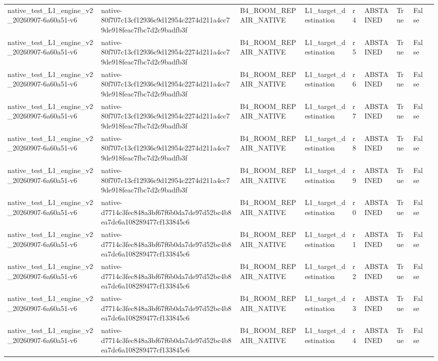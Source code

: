 \begin{tabular}{lllllllll}
native\_test\_L1\_engine\_v2\_20260907-6a60a51-v6 & native-80f707c13cf12936c9d12954c2274d211a4cc79de918feac7fbc7d2c9badfb3f & B4\_ROOM\_REPAIR\_NATIVE & L1\_target\_destination & r4 & ABSTAINED & True & False &  \\
native\_test\_L1\_engine\_v2\_20260907-6a60a51-v6 & native-80f707c13cf12936c9d12954c2274d211a4cc79de918feac7fbc7d2c9badfb3f & B4\_ROOM\_REPAIR\_NATIVE & L1\_target\_destination & r5 & ABSTAINED & True & False &  \\
native\_test\_L1\_engine\_v2\_20260907-6a60a51-v6 & native-80f707c13cf12936c9d12954c2274d211a4cc79de918feac7fbc7d2c9badfb3f & B4\_ROOM\_REPAIR\_NATIVE & L1\_target\_destination & r6 & ABSTAINED & True & False &  \\
native\_test\_L1\_engine\_v2\_20260907-6a60a51-v6 & native-80f707c13cf12936c9d12954c2274d211a4cc79de918feac7fbc7d2c9badfb3f & B4\_ROOM\_REPAIR\_NATIVE & L1\_target\_destination & r7 & ABSTAINED & True & False &  \\
native\_test\_L1\_engine\_v2\_20260907-6a60a51-v6 & native-80f707c13cf12936c9d12954c2274d211a4cc79de918feac7fbc7d2c9badfb3f & B4\_ROOM\_REPAIR\_NATIVE & L1\_target\_destination & r8 & ABSTAINED & True & False &  \\
native\_test\_L1\_engine\_v2\_20260907-6a60a51-v6 & native-80f707c13cf12936c9d12954c2274d211a4cc79de918feac7fbc7d2c9badfb3f & B4\_ROOM\_REPAIR\_NATIVE & L1\_target\_destination & r9 & ABSTAINED & True & False &  \\
native\_test\_L1\_engine\_v2\_20260907-6a60a51-v6 & native-d7714c3fec848a3bf67f6b0da7de97d52bc4b8ea7dc6a108289477cf133845c6 & B4\_ROOM\_REPAIR\_NATIVE & L1\_target\_destination & r0 & ABSTAINED & True & False &  \\
native\_test\_L1\_engine\_v2\_20260907-6a60a51-v6 & native-d7714c3fec848a3bf67f6b0da7de97d52bc4b8ea7dc6a108289477cf133845c6 & B4\_ROOM\_REPAIR\_NATIVE & L1\_target\_destination & r1 & ABSTAINED & True & False &  \\
native\_test\_L1\_engine\_v2\_20260907-6a60a51-v6 & native-d7714c3fec848a3bf67f6b0da7de97d52bc4b8ea7dc6a108289477cf133845c6 & B4\_ROOM\_REPAIR\_NATIVE & L1\_target\_destination & r2 & ABSTAINED & True & False &  \\
native\_test\_L1\_engine\_v2\_20260907-6a60a51-v6 & native-d7714c3fec848a3bf67f6b0da7de97d52bc4b8ea7dc6a108289477cf133845c6 & B4\_ROOM\_REPAIR\_NATIVE & L1\_target\_destination & r3 & ABSTAINED & True & False &  \\
native\_test\_L1\_engine\_v2\_20260907-6a60a51-v6 & native-d7714c3fec848a3bf67f6b0da7de97d52bc4b8ea7dc6a108289477cf133845c6 & B4\_ROOM\_REPAIR\_NATIVE & L1\_target\_destination & r4 & ABSTAINED & True & False &  \\

\end{tabular}
